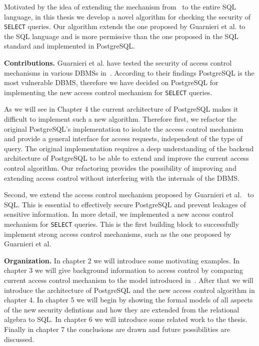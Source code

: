 Motivated by the idea of extending the mechanism from~\cite{guarnieri2016strong} to the entire SQL language, in this thesis we develop a novel algorithm for checking the security of \texttt{SELECT} queries.
%
Our algorithm extends the one proposed by Guarnieri et al. to the SQL language and is more permissive than the one proposed in the SQL standard and  implemented in PostgreSQL.
\newline

\smallskip
\noindent
{\bf Contributions.}
%
Guarnieri et al. have tested the security of access control mechanisms in various DBMSs in~\cite{guarnieri2016strong}.
%
According to their findings PostgreSQL is the most vulnerable DBMS, therefore we have decided on PostgreSQL for implementing the new access control mechanism for \texttt{SELECT} queries.

As we will see in Chapter 4 the current architecture of PostgreSQL makes it difficult to implement such a new algorithm.
%
Therefore first, we refactor the original PostgreSQL's implementation to isolate the access control mechanism and provide a general interface for access requests, independent of the type of query.
%
The original implementation requires a deep understanding of the backend architecture of PostgreSQL to be able to extend and improve the current access control algorithm.
%
Our refactoring provides the possibility of improving and extending access control without interfering with the internals of the DBMS.
%

Second, we extend the access control mechanism proposed by Guarnieri et al.~\cite{guarnieri2016strong} to SQL.
%
This is essential to effectively secure PostgreSQL and prevent leakages of sensitive information.
%
In more detail, we implemented a new access control mechanism for \texttt{SELECT} queries.
%
This is the first building block to successfully implement strong access control mechanisms, such as the one proposed by Guarnieri et al.

\smallskip
\noindent
{\bf Organization.}
%
In chapter 2 we will introduce some motivating examples.
%
In chapter 3 we will give background information to access control by comparing current access control mechanism to the model introduced in~\cite{guarnieri2016strong}.
%
After that we will introduce the architecture of PostgreSQL and the new access control algorithm in chapter 4. 
%
In chapter 5 we will begin by showing the formal models of all aspects of the new security defintions and how they are extended from the relational algebra to SQL.  
%
In chapter 6 we will introduce some related work to the thesis. 
%
Finally in chapter 7 the conclusions are drawn and future possibilities are discussed.